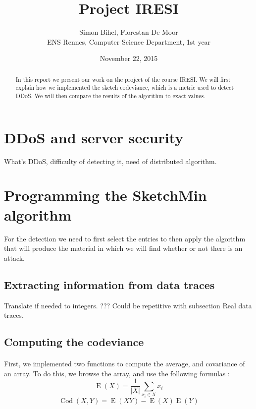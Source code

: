 \documentclass[a4paper]{article}%
\DeclareMathOperator{\E}{E}
\DeclareMathOperator{\Cod}{Cod}
\begin{document}
\title{Project IRESI}

\author{Simon Bihel, Florestan De Moor \\ ENS Rennes, Computer Science Department, 1st year}

\date{November 22, 2015}

\maketitle

\begin{abstract}
	In this report we present our work on the project of the course IRESI. We will first explain how we implemented the sketch codeviance, which is a metric used to detect DDoS. We will then compare the results of the algorithm to exact values.
\end{abstract}


\section{DDoS and server security}
What's DDoS, difficulty of detecting it, need of distributed algorithm.


\section{Programming the SketchMin algorithm}
For the detection we need to first select the entries to then apply the algorithm that will produce the material in which we will find whether or not there is an attack.

\subsection{Extracting information from data traces}
Translate if needed to integers. ??? Could be repetitive with subsection Real data traces.

\subsection{Computing the codeviance}

\paragraph{}First, we implemented two functions to compute the average, and covariance of an array. To do this, we browse the array, and use the following formulas :
	\[ \E(X) = \frac{1}{|X|} \sum\limits_{x_i \in X} x_i \]
	\[ \Cod(X,Y) = \E(XY) - \E(X)\E(Y) \]
	
\end{document}
